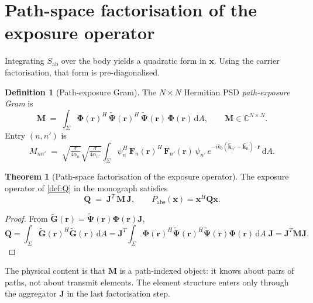 \documentclass[11pt,a4paper]{article}
\theoremstyle{definition}
\newtheorem{theorem}{Theorem}[section]
\newtheorem{definition}[definition]{Definition}
\newcommand{\khat}{\hat{\bm{k}}}
\newcommand{\rr}{\mathbf{r}}
\newcommand{\Sab}{S_{\mathrm{ab}}}
\newcommand{\diff}{\mathrm{d}}
\newcommand{\Complex}{\mathbb{C}}
\newcommand{\Jmat}{\mathbf{J}}                 %
\newcommand{\Phimat}{\mathbf{\Phi}}            %
\newcommand{\Psitil}{\tilde{\bm{\Psi}}}        %
\newcommand{\Mmat}{\mathbf{M}}                 %
\newcommand{\Qmat}{\mathbf{Q}}                 %
\newcommand{\xx}{\mathbf{x}}
\newcommand{\Fn}{\mathbf{F}_n}
\newcommand{\Gtil}{\tilde{\mathbf{G}}}
\newcommand{\Sigmabody}{\Sigma}
\begin{document}
\section{Path-space factorisation of the exposure operator}
\label{sec:Q-factor}

Integrating $\Sab$ over the body yields a quadratic form in $\xx$.  Using
the carrier factorisation, that form is pre-diagonalised.

\begin{definition}[Path-exposure Gram]\label{def:M}
The $N\times N$ Hermitian PSD \emph{path-exposure Gram} is
\begin{equation}\label{eq:M-def}
  \Mmat\;=\;\int_{\Sigmabody}
  \Phimat(\rr)^H\,\Psitil(\rr)^H\,\Psitil(\rr)\,\Phimat(\rr)\,\diff A,
  \qquad\Mmat\in\Complex^{N\times N}.
\end{equation}
Entry $(n,n')$ is
\begin{equation}\label{eq:M-entry}
  M_{nn'}\;=\;\sqrt{\tfrac{\sigma}{4\alpha_n}}
  \sqrt{\tfrac{\sigma}{4\alpha_{n'}}}
  \int_{\Sigmabody}
  \psi_n^H\,\Fn(\rr)^H\,\mathbf{F}_{n'}(\rr)\,\psi_{n'}\,
  e^{-ik_0(\khat_{n'}-\khat_n)\cdot\rr}\,\diff A.
\end{equation}
\end{definition}

\begin{theorem}[Path-space factorisation of the exposure operator]%
\label{thm:Q-factor}
The exposure operator of \cref{def:Q} in the monograph satisfies
\begin{equation}\label{eq:Q-JMJ}
  \boxed{\;
  \Qmat\;=\;\Jmat^T\,\Mmat\,\Jmat,
  \qquad P_\mathrm{abs}(\xx)=\xx^H\Qmat\xx.
  \;}
\end{equation}
\end{theorem}

\begin{proof}
From $\Gtil(\rr)=\Psitil(\rr)\Phimat(\rr)\Jmat$,
\[
  \Qmat=\int_{\Sigmabody}\Gtil(\rr)^H\Gtil(\rr)\,\diff A
       =\Jmat^T\!\int_{\Sigmabody}\Phimat(\rr)^H\Psitil(\rr)^H
        \Psitil(\rr)\Phimat(\rr)\,\diff A\;\Jmat
       =\Jmat^T\Mmat\Jmat.
\]
\end{proof}

The physical content is that $\Mmat$ is a path-indexed object: it knows
about pairs of paths, not about transmit elements.  The element structure
enters only through the aggregator $\Jmat$ in the last factorisation step.
\end{document}
